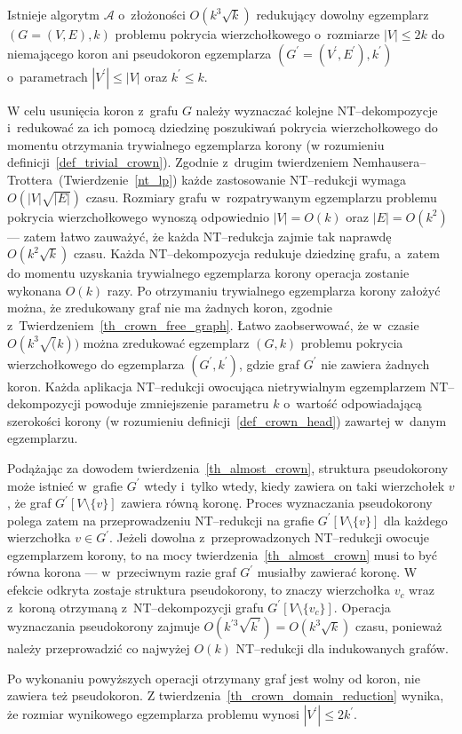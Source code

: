 {  \begin{theorem}
    Istnieje algorytm $\mathcal{A}$ o~złożoności $O(k^3\sqrt{k})$ redukujący dowolny egzemplarz $(G=(V, E), k)$ problemu pokrycia wierzchołkowego o~rozmiarze $|V|\leq 2k$ do niemającego koron ani pseudokoron egzemplarza $(G^\prime=(V^\prime, E^\prime), k^\prime)$ o~parametrach $|V^\prime| \leq |V|$ oraz $k^\prime \leq k$.
  \end{theorem}
  \begin{bproof}
    W celu usunięcia koron z~grafu $G$ należy wyznaczać kolejne NT--dekompozycje i~redukować za ich pomocą dziedzinę poszukiwań pokrycia wierzchołkowego do momentu otrzymania trywialnego egzemplarza korony (w rozumieniu definicji~\ref{def_trivial_crown}).
    Zgodnie z~drugim twierdzeniem Nemhausera--Trottera~(Twierdzenie~\ref{nt_lp}) każde zastosowanie NT--redukcji wymaga $O(|V|\sqrt{|E|})$ czasu.
    Rozmiary grafu w~rozpatrywanym egzemplarzu problemu pokrycia wierzchołkowego wynoszą odpowiednio $|V|=O(k)$ oraz $|E|=O(k^2)$ --- zatem łatwo zauważyć, że każda NT--redukcja zajmie tak naprawdę $O(k^2\sqrt{k})$ czasu.
    Każda NT--dekompozycja redukuje dziedzinę grafu, a~zatem do momentu uzyskania trywialnego egzemplarza korony operacja zostanie wykonana $O(k)$ razy.
    Po otrzymaniu trywialnego egzemplarza korony założyć można, że zredukowany graf nie ma żadnych koron, zgodnie z~Twierdzeniem~\ref{th_crown_free_graph}.
    Łatwo zaobserwować, że w~czasie $O(k^3\sqrt(k))$ można zredukować egzemplarz $(G, k)$ problemu pokrycia wierzchołkowego do egzemplarza $(G^\prime, k^\prime)$, gdzie graf $G^\prime$ nie zawiera żadnych koron.
    Każda aplikacja NT--redukcji owocująca nietrywialnym egzemplarzem NT--dekompozycji powoduje zmniejszenie parametru $k$ o~wartość odpowiadającą szerokości korony (w rozumieniu definicji~\ref{def_crown_head}) zawartej w~danym egzemplarzu.

    Podążając za dowodem twierdzenia~\ref{th_almost_crown}, struktura pseudokorony może istnieć w~grafie $G^\prime$ wtedy i~tylko wtedy, kiedy zawiera on taki wierzchołek $v$, że graf $G^\prime[V \setminus \{v\}]$ zawiera równą koronę.
    Proces wyznaczania pseudokorony polega zatem na przeprowadzeniu NT--redukcji na grafie $G^\prime[V \setminus \{v\}]$ dla każdego wierzchołka $v \in G^\prime$.
    Jeżeli dowolna z~przeprowadzonych NT--redukcji owocuje egzemplarzem korony, to na mocy twierdzenia~\ref{th_almost_crown} musi to być równa korona --- w~przeciwnym razie graf $G^\prime$ musiałby zawierać koronę.
    W efekcie odkryta zostaje struktura pseudokorony, to znaczy wierzchołka $v_c$ wraz z~koroną otrzymaną z~NT--dekompozycji grafu $G^\prime[V \setminus \{v_c\}]$.
    Operacja wyznaczania pseudokorony zajmuje $O(k^{\prime3}\sqrt{k^\prime})=O(k^3\sqrt{k})$ czasu, ponieważ należy przeprowadzić co najwyżej $O(k)$ NT--redukcji dla indukowanych grafów.

    Po wykonaniu powyższych operacji otrzymany graf jest wolny od koron, nie zawiera też pseudokoron.
    Z twierdzenia~\ref{th_crown_domain_reduction} wynika, że rozmiar wynikowego egzemplarza problemu wynosi $|V^\prime| \leq 2k^\prime$.
  \end{bproof}
}
